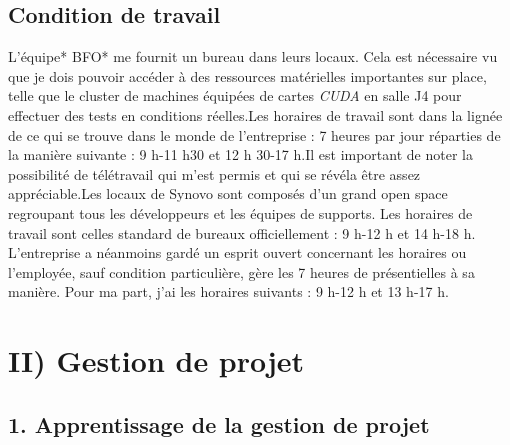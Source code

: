 \documentclass[french, 11pt]{memoir}
\begin{document}
\subsection{Condition de travail}\label{condition-de-travail}

L'équipe* BFO* me fournit un bureau dans leurs locaux. Cela est
nécessaire vu que je dois pouvoir accéder à des ressources matérielles
importantes sur place, telle que le cluster de machines équipées de
cartes \emph{CUDA} en salle J4 pour effectuer des tests en conditions
réelles.Les horaires de travail sont dans la lignée de ce qui se trouve
dans le monde de l'entreprise : 7 heures par jour réparties de la
manière suivante : 9 h-11 h30 et 12 h 30-17 h.Il est important de noter
la possibilité de télétravail qui m'est permis et qui se révéla être
assez appréciable.Les locaux de Synovo sont composés d'un grand open
space regroupant tous les développeurs et les équipes de supports. Les
horaires de travail sont celles standard de bureaux officiellement : 9
h-12 h et 14 h-18 h. L'entreprise a néanmoins gardé un esprit ouvert
concernant les horaires ou l'employée, sauf condition particulière, gère
les 7 heures de présentielles à sa manière. Pour ma part, j'ai les
horaires suivants : 9 h-12 h et 13 h-17 h.

\section{II) Gestion de projet}\label{ii-gestion-de-projet}

\subsection{1. Apprentissage de la gestion de
	projet}\label{apprentissage-de-la-gestion-de-projet}
\end{document}
